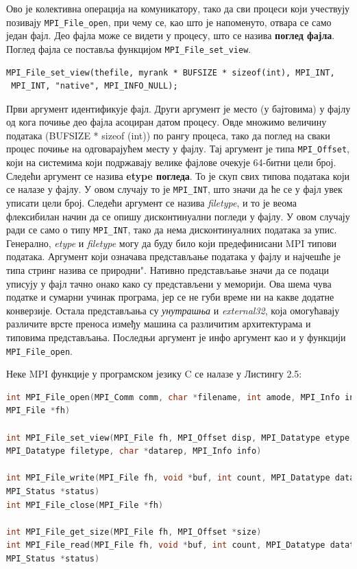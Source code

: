 Ово је колективна операција  на комуникатору, тако да сви процеси који учествују позивају \texttt{MPI\_File\_open}, при чему се, као што је напоменуто, отвара се само један фајл. Део фајла може се видети у процесу, што се назива \textbf{поглед фајла}. Поглед фајла се поставља функцијом \texttt{MPI\_File\_set\_view}.

\begin{verbatim}
MPI_File_set_view(thefile, myrank * BUFSIZE * sizeof(int), MPI_INT,
 MPI_INT, "native", MPI_INFO_NULL);
\end{verbatim}

Први аргумент идентификује фајл. Други аргумент је место (у бајтовима) у фајлу од кога почиње део фајла асоциран датом процесу.
Овде множимо величину података (BUFSIZE * sizeof (int)) по рангу процеса, тако да поглед на сваки процес почиње на одговарајућем месту у фајлу.
Тај аргумент је типа \texttt{MPI\_Offset}, који на системима који подржавају велике фајлове очекује 64-битни цели број. Следећи аргумент се назива \textbf{etype погледа}. То је скуп свих типова података који се налазе у фајлу. У овом случају то је \texttt{MPI\_INT}, што значи да ће се у фајл увек уписати цели број. Следећи аргумент се назива \textit{filetype}, и то је веома флексибилан начин да се опишу дисконтинуални погледи у фајлу. У овом случају ради се само о типу \texttt{MPI\_INT}, тако да нема дисконтинуалних података за упис. Генерално, \textit{etype} и \textit{filetype} могу да буду било који предефинисани MPI типови података. Аргумент који означава представљање података у фајлу и најчешће је типа стринг назива се \zn природни". Нативно представљање значи да се подаци уписују у фајл тачно онако како су представљени у меморији. Ова шема чува податке и сумарни учинак програма, јер се не губи време ни на какве додатне конверзије.
Остала представљања су \textit{унутрашња} и \textit{external32}, која омогућавају различите врсте преноса између машина са различитим архитектурама и типовима представљања.
Последњи аргумент је инфо аргумент као и у функцији \texttt{MPI\_File\_open}.

Неке MPI функције у програмском језику C се налазе у Листингу 2.5:

\begin{lstlisting}[style=nonumbers,frame=single, language=C, caption=MPI функције]
int MPI_File_open(MPI_Comm comm, char *filename, int amode, MPI_Info info,
MPI_File *fh)

int MPI_File_set_view(MPI_File fh, MPI_Offset disp, MPI_Datatype etype,
MPI_Datatype filetype, char *datarep, MPI_Info info)

int MPI_File_write(MPI_File fh, void *buf, int count, MPI_Datatype datatype,
MPI_Status *status)
int MPI_File_close(MPI_File *fh)

int MPI_File_get_size(MPI_File fh, MPI_Offset *size)
int MPI_File_read(MPI_File fh, void *buf, int count, MPI_Datatype datatype,
MPI_Status *status)
\end{lstlisting}

